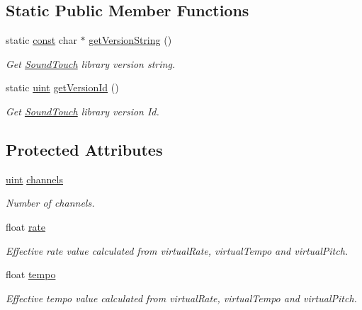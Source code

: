 \subsection*{Static Public Member Functions}
\begin{DoxyCompactItemize}
\item 
static \hyperlink{getopt1_8c_a2c212835823e3c54a8ab6d95c652660e}{const} char $\ast$ \hyperlink{classsoundtouch_1_1_sound_touch_a275f312df3018f9c0a5b6abc5eb58f4c}{get\+Version\+String} ()
\begin{DoxyCompactList}\small\item\em Get \hyperlink{classsoundtouch_1_1_sound_touch}{Sound\+Touch} library version string. \end{DoxyCompactList}\item 
static \hyperlink{_s_t_types_8h_a91ad9478d81a7aaf2593e8d9c3d06a14}{uint} \hyperlink{classsoundtouch_1_1_sound_touch_ab63d5bf2341d713ba7a704a3ac102717}{get\+Version\+Id} ()
\begin{DoxyCompactList}\small\item\em Get \hyperlink{classsoundtouch_1_1_sound_touch}{Sound\+Touch} library version Id. \end{DoxyCompactList}\end{DoxyCompactItemize}
\subsection*{Protected Attributes}
\begin{DoxyCompactItemize}
\item 
\hyperlink{_s_t_types_8h_a91ad9478d81a7aaf2593e8d9c3d06a14}{uint} \hyperlink{classsoundtouch_1_1_sound_touch_a7c9deb22aa93f356ac5148a963b86c61}{channels}
\begin{DoxyCompactList}\small\item\em Number of channels. \end{DoxyCompactList}\item 
float \hyperlink{classsoundtouch_1_1_sound_touch_a6b772ab33d35b66f48b794e1fef20520}{rate}
\begin{DoxyCompactList}\small\item\em Effective \textquotesingle{}rate\textquotesingle{} value calculated from \textquotesingle{}virtual\+Rate\textquotesingle{}, \textquotesingle{}virtual\+Tempo\textquotesingle{} and \textquotesingle{}virtual\+Pitch\textquotesingle{}. \end{DoxyCompactList}\item 
float \hyperlink{classsoundtouch_1_1_sound_touch_ad4687df9f1a419f6ac7aff28b5bea3a6}{tempo}
\begin{DoxyCompactList}\small\item\em Effective \textquotesingle{}tempo\textquotesingle{} value calculated from \textquotesingle{}virtual\+Rate\textquotesingle{}, \textquotesingle{}virtual\+Tempo\textquotesingle{} and \textquotesingle{}virtual\+Pitch\textquotesingle{}. \end{DoxyCompactList}\end{DoxyCompactItemize}
